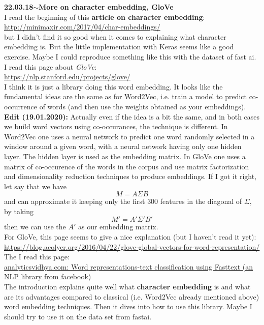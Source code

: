 \documentclass[11pt,a4paper]{article}
\newenvironment{loggentry}[2]%
{\noindent\textbf{#1}\hspace{1cm}$\mathbf{\sim}$\text{ }\textbf{#2}\\}{\vspace{0.5cm}}
\begin{document}
\begin{loggentry}{22.03.18}{More on character embedding, GloVe}
I read the beginning of this \textbf{article on character embedding}:\\
\url{http://minimaxir.com/2017/04/char-embeddings/}\\
but I didn't find it so good when it comes to explaining what character embedding is. But the little implementation with Keras seems like a good exercise. Maybe I could reproduce something like this with the dataset of fast ai.\\
I read this page about \textit{GloVe}:\\
\url{https://nlp.stanford.edu/projects/glove/}\\
I think it is just a library doing this word embedding. It looks like the fundamental ideas are the same as for Word2Vec, i.e. train a model to predict co-occurrence of words (and then use the weights obtained as your embeddings).\\
\textbf{Edit (19.01.2020):} Actually even if the idea is a bit the same, and in both cases we build word vectors using co-occurances, the technique is different. In Word2Vec one uses a neural network to predict one word randomly selected in a window around a given word, with a neural network having only one hidden layer. The hidden layer is used as the embedding matrix. In GloVe one uses a matrix of co-occurence of the words in the corpus and use matrix factorization and dimensionality reduction techniques to produce embeddings. If I got it right, let say that we have
$$
M = A \Sigma B
$$
and can approximate it keeping only the first $300$ features in the diagonal of $\Sigma$, by taking
$$
M' = A' \Sigma' B'
$$
then we can use the $A'$ as our embedding matrix.\\
For GloVe, this page seems to give a nice explanation (but I haven't read it yet):\\
\url{https://blog.acolyer.org/2016/04/22/glove-global-vectors-for-word-representation/}\\
The I read this page:\\
\href{https://www.analyticsvidhya.com/blog/2017/07/word-representations-text-classification-using-fasttext-nlp-facebook/}{analyticsvidhya.com: Word representations-text classification using Fasttext (an NLP library from facebook)}\\
The introduction explains quite well what \textbf{character embedding} is and what are its advantages compared to classical (i.e. Word2Vec already mentioned above) word embedding techniques. Then it dives into how to use this library. Maybe I should try to use it on the data set from fastai.
\end{loggentry}
\end{document}
